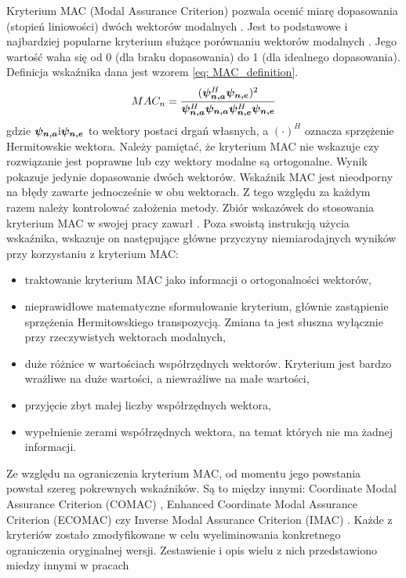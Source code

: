 Kryterium MAC (Modal Assurance Criterion) pozwala ocenić miarę dopasowania (stopień liniowości) dwóch wektorów modalnych \parencite{Allemang1982}. Jest to podstawowe i najbardziej popularne kryterium służące porównaniu wektorów modalnych \cite{Rainieri2014}. Jego wartość waha się od 0 (dla braku dopasowania) do 1 (dla idealnego dopasowania). Definicja wskaźnika dana jest wzorem \ref{eq: MAC_definition}.
\begin{equation} \label{eq: MAC_definition}
	MAC_n = \frac{ (\bm{\psi_{n,a}}^H\bm{\psi_{n,e}})^2}
	{\bm{\psi_{n,a}}^H\bm{\psi_{n,a}}\bm{\psi_{n,e}}^H\bm{\psi_{n,e}}}
\end{equation}
gdzie $\bm{\psi_{n,a}} \text{i} \bm{\psi_{n,e}}$ to wektory postaci drgań własnych, a $(\cdot)^H$ oznacza sprzężenie Hermitowskie wektora.
Należy pamiętać, że kryterium MAC nie wskazuje czy rozwiązanie jest poprawne lub czy wektory modalne są ortogonalne. Wynik pokazuje jedynie dopasowanie dwóch wektorów. Wskaźnik MAC jest nieodporny na błędy zawarte jednocześnie w obu wektorach. Z tego względu za każdym razem należy kontrolować założenia metody. Zbiór wskazówek do stosowania kryterium MAC w swojej pracy zawarł \cite{Allemang2003}. Poza swoistą instrukcją użycia wskaźnika, wskazuje on następujące główne przyczyny niemiarodajnych wyników przy korzystaniu z kryterium MAC:
\begin{itemize}
	\item traktowanie kryterium MAC jako informacji o ortogonalności wektorów,
	\item nieprawidłowe matematyczne sformułowanie kryterium, głównie zastąpienie sprzężenia Hermitowskiego transpozycją. Zmiana ta jest słuszna wyłącznie przy rzeczywistych wektorach modalnych,
	\item duże różnice w wartościach współrzędnych wektorów. Kryterium jest bardzo wrażliwe na duże wartości, a niewrażliwe na małe wartości,
	\item przyjęcie zbyt małej liczby współrzędnych wektora,
	\item wypełnienie zerami współrzędnych wektora, na temat których nie ma żadnej informacji.
\end{itemize}

Ze względu na ograniczenia kryterium MAC, od momentu jego powstania powstał szereg pokrewnych wskaźników. Są to między innymi: Coordinate Modal Assurance Criterion (COMAC) \parencite{Ewins2000}, Enhanced Coordinate Modal Assurance Criterion (ECOMAC) \parencite{Hunt1992} czy Inverse Modal Assurance Criterion (IMAC) \parencite{MITCHELL1998}. Każde z kryteriów zostało zmodyfikowane w celu wyeliminowania konkretnego ograniczenia oryginalnej wersji. Zestawienie i opis wielu z nich przedstawiono miedzy innymi w pracach \parencite{Allemang2003,Rainieri2014,Szafranski2013,Salamak2003} 

